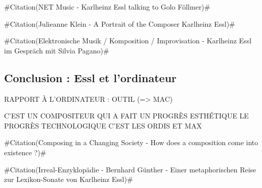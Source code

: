 \documentclass[a4paper,12pt]{article}
\newcommand{\zitat}[2]{\#Citation(#2)\#}
\begin{document}
\zitat{GF: Do you think that the net has a specific musical potential? KHE: From my personal experience, I think that the most important thing is the communication aspect.}
{NET Music - Karlheinz Essl talking to Golo Föllmer}

\zitat{When not composing himself, he is busy inspiring a generation of younger composers in his position as Professor of Composition at the Vienna University of Music and Performing Arts. Beyond this, Essl is also influential in the cultivation and dissemination of new art, particularly seen in his co-direction of the family-run Essl Museum, a modern art museum based outside of Vienna. Here Essl has fueled a series of innovative programs that expand the boundaries of sonic landscape; educating audiences, inspiring young composers, and erasing the bourgeois line so often perceived in traditionally classical venues.}
{Julieanne Klein - A Portrait of the Composer Karlheinz Essl}

\zitat{Du brauchst nur ein Websearch machen. Mittlerweile tauche ich auch immer wieder in Blogs auf: „Da gibt’s übrigens so einen verrückten Typen in Wien, der macht irre Sachen. Da gibt’s fLOW und den REplay PLAYer...“ oder sie sprechen von einer „eine schattenhafte Figur...“. Das kommt nicht unbedingt aus dem Bereich der Hochkultur, wie wenn man in der Carnegie Hall eine Aufführung hat. Aber es vermittelt einem das Gefühl, dass man irgendwie präsent ist. [...] Wohingegen die Sache mit Internet unheimlich schnell reagiert und sich besser verbreitet und nicht von wenigen Zentren aus gesteuert wird.}
{Elektronische Musik / Komposition / Improvisation - Karlheinz Essl im Gespräch mit Silvia Pagano}


\subsection{Conclusion : Essl et l'ordinateur}

RAPPORT À L'ORDINATEUR :
OUTIL (=> MAC)

C'EST UN COMPOSITEUR QUI A FAIT UN PROGRÈS ESTHÉTIQUE
LE PROGRÈS TECHNOLOGIQUE C'EST LES ORDIS ET MAX

\zitat{My formal thinking takes place in a bipolar field of tension, namely that between work and process. (…) For me, the most captivating aspect of composing is the reconciliation of these opposites, though each time in a different way.}
{Composing in a Changing Society - How does a composition come into existence ?}

\zitat{Essl nutzt die heutigen Möglichkeiten der TECHNIK als Mittel, musikalische Möglichkeitsstrukturen zu schaffen, die in der Lage sind, unbeliebig Anderes zu realisieren als die Vorstellung des Komponisten.}
{Irreal-Enzyklopädie - Bernhard Günther - Einer metaphorischen Reise zur Lexikon-Sonate von Karlheinz Essl}
\end{document}
